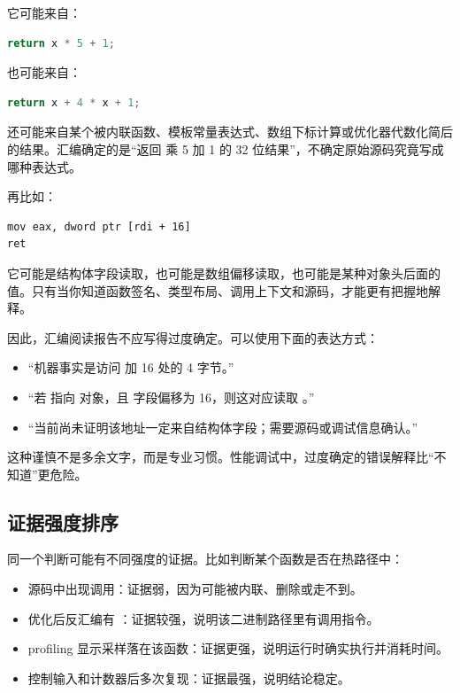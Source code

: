 它可能来自：

\begin{lstlisting}[language=C++]
return x * 5 + 1;
\end{lstlisting}

也可能来自：

\begin{lstlisting}[language=C++]
return x + 4 * x + 1;
\end{lstlisting}

还可能来自某个被内联函数、模板常量表达式、数组下标计算或优化器代数化简后的结果。汇编确定的是“返回  乘 5 加 1 的 32 位结果”，不确定原始源码究竟写成哪种表达式。

再比如：

\begin{lstlisting}
mov eax, dword ptr [rdi + 16]
ret
\end{lstlisting}

它可能是结构体字段读取，也可能是数组偏移读取，也可能是某种对象头后面的值。只有当你知道函数签名、类型布局、调用上下文和源码，才能更有把握地解释。

因此，汇编阅读报告不应写得过度确定。可以使用下面的表达方式：

\begin{itemize}
  \item “机器事实是访问  加 16 处的 4 字节。”
  \item “若  指向  对象，且  字段偏移为 16，则这对应读取 。”
  \item “当前尚未证明该地址一定来自结构体字段；需要源码或调试信息确认。”
\end{itemize}

这种谨慎不是多余文字，而是专业习惯。性能调试中，过度确定的错误解释比“不知道”更危险。

\subsection{证据强度排序}

同一个判断可能有不同强度的证据。比如判断某个函数是否在热路径中：

\begin{itemize}
  \item 源码中出现调用：证据弱，因为可能被内联、删除或走不到。
  \item 优化后反汇编有 ：证据较强，说明该二进制路径里有调用指令。
  \item profiling 显示采样落在该函数：证据更强，说明运行时确实执行并消耗时间。
  \item 控制输入和计数器后多次复现：证据最强，说明结论稳定。
\end{itemize}

